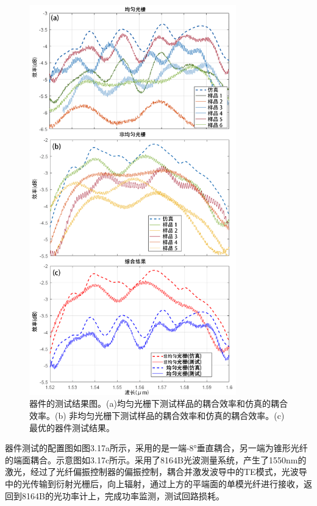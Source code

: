 \begin{figure}[!htbp]
    \centering
    \includegraphics[width=0.8\textwidth]{Img/3-18.png}
    \caption{ 器件的测试结果图。(a)均匀光栅下测试样品的耦合效率和仿真的耦合效率。(b) 非均匀光栅下测试样品的耦合效率和仿真的耦合效率。(c) 最优的器件测试结果。}
    \label{fig:3-18}
\end{figure}

器件测试的配置图如图3.17a所示，采用的是一端-8°垂直耦合，另一端为锥形光纤的端面耦合。示意图如3.17c所示。采用了8164B光波测量系统，产生了1550nm的激光，经过了光纤偏振控制器的偏振控制，耦合并激发波导中的TE模式，光波导中的光传输到衍射光栅后，向上辐射，通过上方的平端面的单模光纤进行接收，返回到8164B的光功率计上，完成功率监测，测试回路损耗。

